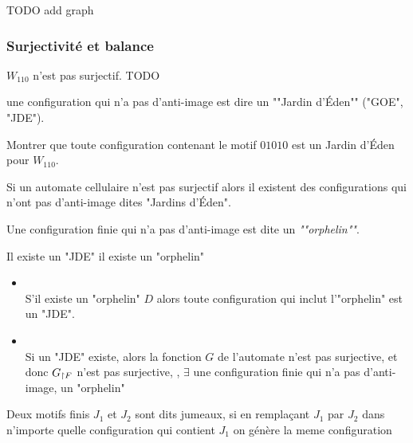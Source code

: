 TODO add graph

\subsubsection{Surjectivité et balance}

\begin{exemple}
	$W_{110}$ n'est pas surjectif. TODO
\end{exemple}

\begin{definition}
	une configuration qui n'a pas d'anti-image est dire un ""Jardin d'Éden"" ("GOE", "JDE").
\end{definition}

\begin{exercice}
	Montrer que toute configuration contenant le motif $01010$ est un Jardin d'Éden pour $W_{110}$.
\end{exercice}

\begin{remarque}
	Si un automate cellulaire n'est pas surjectif alors il existent des configurations qui n'ont pas d'anti-image dites "Jardins d'Éden".
\end{remarque}

\begin{definition}
	Une configuration finie qui n'a pas d'anti-image est dite un \emph{""orphelin""}.
\end{definition}

\begin{prop}
	Il existe un "JDE" \ssi il existe un "orphelin"
\end{prop}


\begin{proofI}
	\begin{itemize}
		\item \bimpRL\\
		      S'il existe un "orphelin" $D$ alors toute configuration qui inclut l'"orphelin" est un "JDE".
		\item \bimpLR\\
		      Si un "JDE" existe, alors la fonction $G$ de l'automate n'est pas surjective, et donc $G_{\restriction F}$ n'est pas surjective,
		      \cad, $\exists$ une configuration finie qui n'a pas d'anti-image, \ie un "orphelin"
	\end{itemize}
\end{proofI}

\begin{definition}
	Deux motifs finis $J_1$ et $J_2$ sont dits jumeaux, si en remplaçant $J_1$ par $J_2$ dans
	n'importe quelle configuration qui contient $J_1$ on génère la meme configuration
\end{definition}


